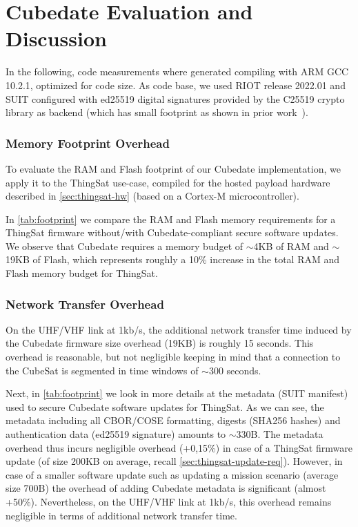 \section{Cubedate Evaluation and Discussion}
\label{sec:evaluation}



In the following, code measurements where generated compiling with ARM GCC 10.2.1,
optimized for code size. As code base, we used RIOT release 2022.01 and SUIT configured with ed25519 digital signatures provided by the C25519 crypto library as backend (which has small footprint as shown in prior work~\cite{zandberg2019secure}).

\subsubsection{Memory Footprint Overhead}

To evaluate the RAM and Flash footprint of our Cubedate implementation, we apply it to the ThingSat use-case, compiled for the hosted payload hardware described in \autoref{sec:thingsat-hw} (based on a Cortex-M microcontroller).

In \autoref{tab:footprint} we compare the RAM and Flash memory requirements for a ThingSat firmware without/with Cubedate-compliant secure software updates.
We observe that Cubedate requires a memory budget of $\sim$4KB of RAM and $\sim$19KB of Flash, which represents roughly a 10\% increase in the total RAM and Flash memory budget for ThingSat.

\subsubsection{Network Transfer Overhead}
On the UHF/VHF link at 1kb/s, the additional network transfer time induced by the Cubedate firmware size overhead (19KB) is roughly 15 seconds. This overhead is reasonable, but not negligible keeping in mind that a connection to the CubeSat is segmented in time windows of $\sim$300 seconds.

Next, in \autoref{tab:footprint} we look in more details at the metadata (SUIT manifest) used to secure Cubedate software updates for ThingSat.
As we can see, the metadata including all CBOR/COSE formatting, digests (SHA256 hashes) and authentication data (ed25519 signature) amounts to $\sim$330B. The metadata overhead thus incurs negligible overhead (+0,15\%) in case of a ThingSat firmware update (of size 200KB on average, recall \autoref{sec:thingsat-update-req}). However, in case of a smaller software update such as updating a mission scenario (average size 700B) the overhead of adding Cubedate metadata is significant (almost +50\%).
Nevertheless, on the UHF/VHF link at 1kb/s, this overhead remains negligible in terms of additional network transfer time.

